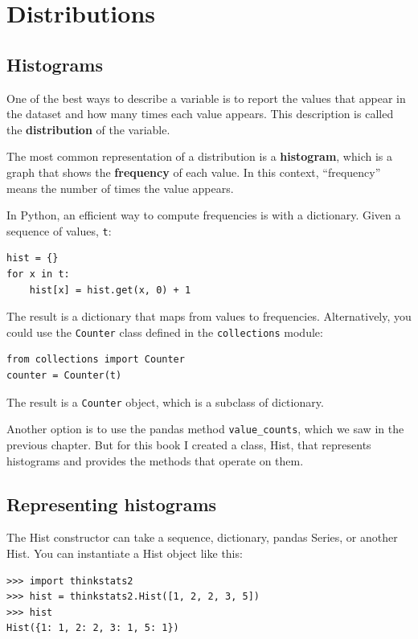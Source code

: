 \documentclass[12pt]{book}
\theoremstyle{exercise}
\begin{document}
\chapter{Distributions}%
\label{descriptive}


\section{Histograms}%
\label{histograms}

One of the best ways to describe a variable is to report the values
that appear in the dataset and how many times each value appears.
This description is called the {\bf distribution} of the variable.%

The most common representation of a distribution is a {\bf histogram},
which is a graph that shows the {\bf frequency} of each value.  In
this context, ``frequency'' means the number of times the value
appears.%
%
%

In Python, an efficient way to compute frequencies is with a
dictionary.  Given a sequence of values, {\tt t}:
%
\begin{verbatim}
hist = {}
for x in t:
    hist[x] = hist.get(x, 0) + 1
\end{verbatim}

The result is a dictionary that maps from values to frequencies.
Alternatively, you could use the {\tt Counter} class defined in the
{\tt collections} module:

\begin{verbatim}
from collections import Counter
counter = Counter(t)
\end{verbatim}

The result is a {\tt Counter} object, which is a subclass of
dictionary.

Another option is to use the pandas method \verb"value_counts", which
we saw in the previous chapter.  But for this book I created a class,
Hist, that represents histograms and provides the methods
that operate on them.%


\section{Representing histograms}%
%

The Hist constructor can take a sequence, dictionary, pandas
Series, or another Hist.  You can instantiate a Hist object like this:
%
\begin{verbatim}
>>> import thinkstats2
>>> hist = thinkstats2.Hist([1, 2, 2, 3, 5])
>>> hist
Hist({1: 1, 2: 2, 3: 1, 5: 1})
\end{verbatim}
\end{document}
